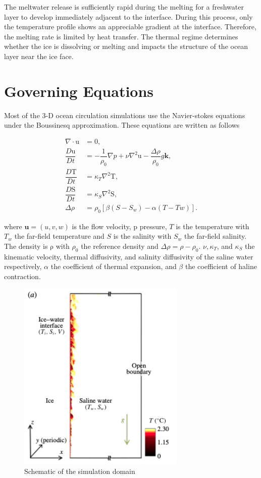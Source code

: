 \documentclass[11pt,a4paper]{article}
\begin{document}
	The meltwater release is sufficiently rapid during the melting for a freshwater layer to develop immediately adjacent to the interface. During this process, only the temperature profile shows an appreciable gradient at the interface. Therefore, the melting rate is limited by heat transfer. The thermal regime determines whether the ice is dissolving or melting and impacts the structure of the ocean layer near the ice face.
	
	\section{Governing Equations}
	
	Most of the 3-D ocean circulation simulations use the Navier-stokes equations under the Boussinesq approximation. These equations are written as follows
	
	\begin{align}
		\nabla\cdot\mathrm{u} &= 0,\\
		\dfrac{D\mathrm{u}}{Dt} & = -\dfrac{1}{\rho_0}\nabla p + \nu\nabla^2\mathrm{u} - \dfrac{\Delta\rho}{\rho_0}g\mathbf{k},\\\label{eq:e3}
		\dfrac{D\mathrm{T}}{Dt} & = \kappa_T\nabla^2\mathrm{T} ,\\ \label{eq:e4}
		\dfrac{D\mathrm{S}}{Dt} & = \kappa_S\nabla^2\mathrm{S} ,\\ 
		\Delta\rho &=\rho_0\left[ \beta(S-S_w) - \alpha(T-Tw)\right].
	\end{align}

	where $\mathbf{u} = (u,v,w)$ is the flow velocity, $\mathrm{p}$ pressure, $T$ is the temperature with $T_w$ the far-field temperature and $S$ is the salinity with $S_w$ the far-field salinity. The density is $\mathrm{\rho}$ with $\rho_0$ the reference density and $\Delta \rho = \rho-\rho_0$. $\nu, \kappa_T$, and $\kappa_S$  the kinematic velocity, thermal diffusivity, and salinity diffusivity of the saline water respectively, $\alpha$  the coefficient of thermal expansion, and $\beta$ the coefficient of haline contraction.
	
	\begin{figure}[H]
	    \centering 
	    \includegraphics[width=8cm]{domain}
	    \caption{Schematic of the simulation domain \cite{gayen2016simulation}}
	\end{figure}
	
\end{document}
